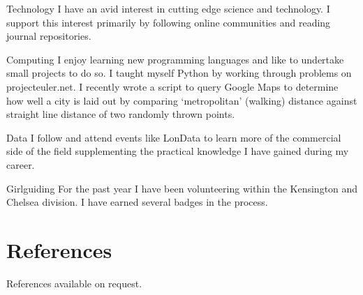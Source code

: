 \documentclass[a4paper]{article}
\begin{document}
\begin{CV}
	
\item[Technology] I have an avid interest in cutting edge science and technology. I support this interest primarily by following online communities and reading journal repositories.

\item[Computing] I enjoy learning new programming languages and like to undertake small projects to do so. I taught myself Python by working through problems on projecteuler.net. I recently wrote a script to query Google Maps to determine how well a city is laid out by comparing `metropolitan' (walking) distance against straight line distance of two randomly thrown points.

\item[Data] I follow and attend events like LonData to learn more of the commercial side of the field supplementing the practical knowledge I have gained during my career.

\item[Girlguiding] For the past year I have been volunteering within the Kensington and Chelsea division. I have earned several badges in the process.

\end{CV}



\section{References}

\noindent References available on request.
\end{document}

